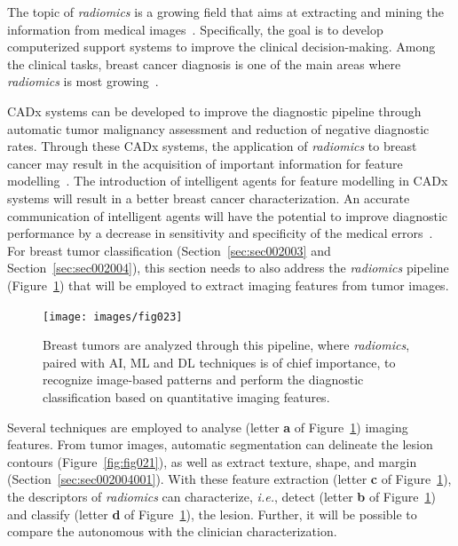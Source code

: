The topic of {\it radiomics} is a growing field that aims at extracting and mining the information from medical images~\cite{van2020radiomics}.
Specifically, the goal is to develop computerized support systems to improve the clinical decision-making.
Among the clinical tasks, breast cancer diagnosis is one of the main areas where {\it radiomics} is most growing~\cite{valdora2018rapid}.

\ac{CADx} systems can be developed to improve the diagnostic pipeline through automatic tumor malignancy assessment and reduction of negative diagnostic rates.
Through these \ac{CADx} systems, the application of {\it radiomics} to breast cancer may result in the acquisition of important information for feature modelling~\cite{10.1007/978-3-030-59716-0_71}.
The introduction of intelligent agents for feature modelling in \ac{CADx} systems will result in a better breast cancer characterization.
An accurate communication of intelligent agents will have the potential to improve diagnostic performance by a decrease in sensitivity and specificity of the medical errors~\cite{doi:10.1148/radiol.2020192039}.
For breast tumor classification (Section~\ref{sec:sec002003} and Section~\ref{sec:sec002004}), this section needs to also address the {\it radiomics} pipeline (Figure~\ref{fig:fig023}) that will be employed to extract imaging features from tumor images.

\begin{figure}[htbp]
\centering
\texttt{[image: images/fig023]}
\caption{Breast tumors are analyzed through this pipeline, where {\it radiomics}, paired with AI, ML and DL techniques is of chief importance, to recognize image-based patterns and perform the diagnostic classification based on quantitative imaging features.}
\label{fig:fig023}
\end{figure}

Several techniques are employed to analyse (letter {\bf a} of Figure~\ref{fig:fig023}) imaging features.
From tumor images, automatic segmentation can delineate the lesion contours (Figure~\ref{fig:fig021}), as well as extract texture, shape, and margin (Section~\ref{sec:sec002004001}).
With these feature extraction (letter {\bf c} of Figure~\ref{fig:fig023}), the descriptors of {\it radiomics} can characterize, {\it i.e.}, detect (letter {\bf b} of Figure~\ref{fig:fig023}) and classify (letter {\bf d} of Figure~\ref{fig:fig023}), the lesion.
Further, it will be possible to compare the autonomous with the clinician characterization.

